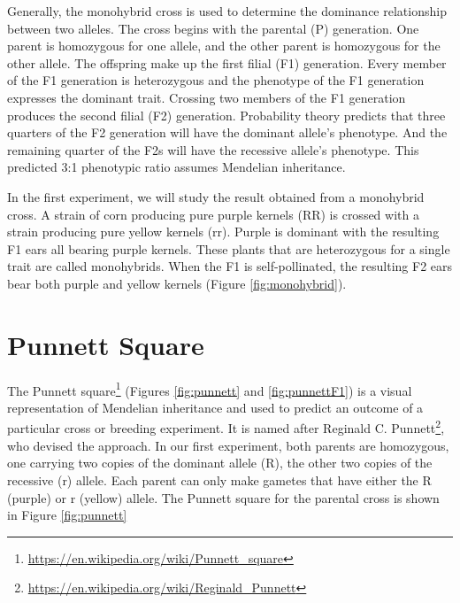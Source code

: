 \documentclass[]{book}
\let\rmarkdownfootnote\footnote%
\def\footnote{\protect\rmarkdownfootnote}
\renewcommand{\href}[2]{#2\footnote{\url{#1}}}
\begin{document}
Generally, the monohybrid cross is used to determine the dominance relationship between two alleles. The cross begins with the parental (P) generation. One parent is homozygous for one allele, and the other parent is homozygous for the other allele. The offspring make up the first filial (F1) generation. Every member of the F1 generation is heterozygous and the phenotype of the F1 generation expresses the dominant trait. Crossing two members of the F1 generation produces the second filial (F2) generation. Probability theory predicts that three quarters of the F2 generation will have the dominant allele's phenotype. And the remaining quarter of the F2s will have the recessive allele's phenotype. This predicted 3:1 phenotypic ratio assumes Mendelian inheritance.

In the first experiment, we will study the result obtained from a monohybrid cross. A strain of corn producing pure purple kernels (RR) is crossed with a strain producing pure yellow kernels (rr). Purple is dominant with the resulting F1 ears all bearing purple kernels. These plants that are heterozygous for a single trait are called monohybrids. When the F1 is self-pollinated, the resulting F2 ears bear both purple and yellow kernels (Figure \ref{fig:monohybrid}).

\hypertarget{punnett-square}{%
\section{Punnett Square}\label{punnett-square}}

The \href{https://en.wikipedia.org/wiki/Punnett_square}{Punnett square} (Figures \ref{fig:punnett} and \ref{fig:punnettF1}) is a visual representation of Mendelian inheritance and used to predict an outcome of a particular cross or breeding experiment. It is named after \href{https://en.wikipedia.org/wiki/Reginald_Punnett}{Reginald C. Punnett}, who devised the approach. In our first experiment, both parents are homozygous, one carrying two copies of the dominant allele (R), the other two copies of the recessive (r) allele. Each parent can only make gametes that have either the R (purple) or r (yellow) allele. The Punnett square for the parental cross is shown in Figure \ref{fig:punnett}
\end{document}
